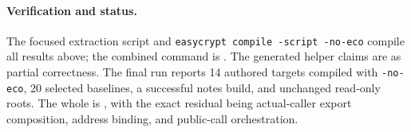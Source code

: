 \paragraph{Verification and status.}
The focused extraction script and
\texttt{easycrypt compile -script -no-eco} compile all results above; the
combined command is .  The generated helper
claims are  as partial correctness.  The final run reports 14
authored targets compiled with \texttt{-no-eco}, 20 selected baselines, a
successful notes build, and unchanged read-only roots.  The whole
 is , with the exact residual
being actual-caller export composition, address binding, and public-call
orchestration.
